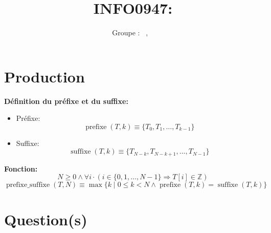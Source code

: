 \documentclass[a4paper, 11pt, oneside]{article}
\title{INFO0947: \intitule}
\author{Groupe \GrNbr : \PrenomUN~\textsc{\NomUN}, \PrenomDEUX~\textsc{\NomDEUX}}
\date{}
\begin{document}
\maketitle


\newcommand{\prefixe}{\operatorname{prefixe}}
\newcommand{\suffixe}{\operatorname{suffixe}}

\section{Production}


\textbf{Définition du préfixe et du suffixe:}
\begin{itemize}
    \item Préfixe:
    \[
        \prefixe(T, k) \equiv \{T_0, T_1, \dots, T_{k-1}\}
    \]
    \item Suffixe:
    \[
        \suffixe(T, k) \equiv \{T_{N-k}, T_{N-k+1}, \dots, T_{N-1}\}
    \]
\end{itemize}


\textbf{Fonction:}
\[
N \geq 0 \land \forall i \cdot (i \in \{0, 1, \dots, N-1\} \Rightarrow T[i] \in \mathbb{Z}) 
\]
\[
\operatorname{prefixe\_suffixe}(T, N) \equiv \max\{k \mid 0 \leq k < N \land \prefixe(T, k) = \suffixe(T, k)\}
\]




\section{Question(s)}

\end{document}
